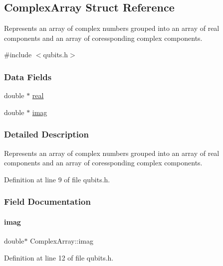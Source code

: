 \hypertarget{structComplexArray}{}\subsection{Complex\+Array Struct Reference}
\label{structComplexArray}


Represents an array of complex numbers grouped into an array of real components and an array of coressponding complex components.  




{\ttfamily \#include $<$qubits.\+h$>$}

\subsubsection*{Data Fields}
\begin{DoxyCompactItemize}
\item 
double $\ast$ \hyperlink{structComplexArray_a1cf9fd31d6dce5ef618d2bcf3e4f8b69}{real}
\item 
double $\ast$ \hyperlink{structComplexArray_aa409fd14e1ff3e1fdcc53cc4eb77a7a8}{imag}
\end{DoxyCompactItemize}


\subsubsection{Detailed Description}
Represents an array of complex numbers grouped into an array of real components and an array of coressponding complex components. 

Definition at line 9 of file qubits.\+h.



\subsubsection{Field Documentation}
\mbox{\label{structComplexArray_aa409fd14e1ff3e1fdcc53cc4eb77a7a8}} 
\paragraph{\texorpdfstring{imag}{imag}}
{\footnotesize\ttfamily double$\ast$ Complex\+Array\+::imag}



Definition at line 12 of file qubits.\+h.



